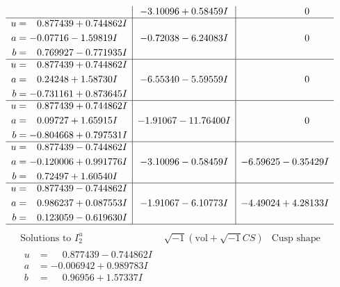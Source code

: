 \documentclass[1p]{elsarticle_modified}
\theoremstyle{definition}
\newcommand{\I}{\sqrt{-1}}
\begin{document}
$$\begin{array}{c|c|c}
 & -3.10096 + 0.58459 I & \phantom{-0.000000 } 0 \\ \hline\begin{aligned}
u &= \phantom{-}0.877439 + 0.744862 I \\
a &= -0.07716 - 1.59819 I \\
b &= \phantom{-}0.769927 - 0.771935 I\end{aligned}
 & -0.72038 - 6.24083 I & \phantom{-0.000000 } 0 \\ \hline\begin{aligned}
u &= \phantom{-}0.877439 + 0.744862 I \\
a &= \phantom{-}0.24248 + 1.58730 I \\
b &= -0.731161 + 0.873645 I\end{aligned}
 & -6.55340 - 5.59559 I & \phantom{-0.000000 } 0 \\ \hline\begin{aligned}
u &= \phantom{-}0.877439 + 0.744862 I \\
a &= \phantom{-}0.09727 + 1.65915 I \\
b &= -0.804668 + 0.797531 I\end{aligned}
 & -1.91067 - 11.76400 I & \phantom{-0.000000 } 0 \\ \hline\begin{aligned}
u &= \phantom{-}0.877439 - 0.744862 I \\
a &= -0.120006 + 0.991776 I \\
b &= \phantom{-}0.72497 + 1.60540 I\end{aligned}
 & -3.10096 - 0.58459 I & -6.59625 - 0.35429 I \\ \hline\begin{aligned}
u &= \phantom{-}0.877439 - 0.744862 I \\
a &= \phantom{-}0.986237 + 0.087553 I \\
b &= \phantom{-}0.123059 - 0.619630 I\end{aligned}
 & -1.91067 - 6.10773 I & -4.49024 + 4.28133 I\\
 \hline 
 \end{array}$$\newpage$$\begin{array}{c|c|c}  
\text{Solutions to }I^u_{2}& \I (\text{vol} + \sqrt{-1}CS) & \text{Cusp shape}\\
 \hline 
\begin{aligned}
u &= \phantom{-}0.877439 - 0.744862 I \\
a &= -0.006942 + 0.989783 I \\
b &= \phantom{-}0.96956 + 1.57337 I\end{aligned}

\end{array}$$
\end{document}
